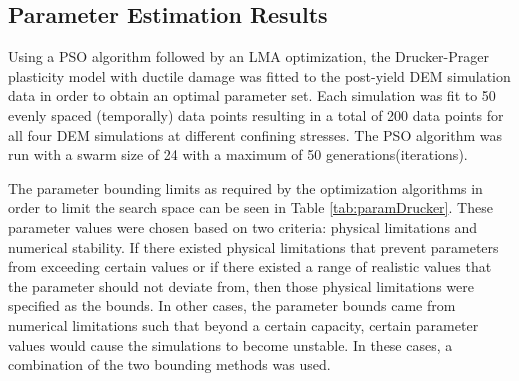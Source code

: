 \subsection{Parameter Estimation Results}

Using a PSO algorithm followed by an LMA optimization, the Drucker-Prager plasticity model with ductile damage was fitted to the post-yield DEM simulation data in order to obtain an optimal parameter set. Each simulation was fit to 50 evenly spaced (temporally) data points resulting in a total of 200 data points for all four DEM simulations at different confining stresses. The PSO algorithm was run with a swarm size of 24 with a maximum of 50 generations(iterations).

The parameter bounding limits as required by the optimization algorithms in order to limit the search space can be seen in Table \ref{tab:paramDrucker}. These parameter values were chosen based on two criteria: physical limitations and numerical stability. If there existed physical limitations that prevent parameters from exceeding certain values or if there existed a range of realistic values that the parameter should not deviate from, then those physical limitations were specified as the bounds. In other cases, the parameter bounds came from numerical limitations such that beyond a certain capacity, certain parameter values would cause the simulations to become unstable. In these cases, a combination of the two bounding methods was used. 

